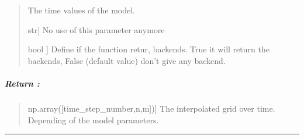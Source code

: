 \documentclass[letterpaper,10pt,english]{sphinxmanual}
\begin{document}
\begin{fulllineitems}
\begin{quote}
\begin{description}
\sphinxAtStartPar
The time values of the model.

\sphinxlineitem{interp\_type}{[}str{]}
\sphinxAtStartPar
No use of this parameter anymore

\sphinxlineitem{backend}{[}bool {]}
\sphinxAtStartPar
Define if the function retur, backends. True it will return the backends, False (default value) don’t give any backend.

\end{description}
\end{quote}


\subparagraph{Return :}
\label{\detokenize{GRID_doc/TIME_GRID_doc:return}}\begin{quote}
\begin{description}
\sphinxlineitem{grid\_interpolated}{[}np.array({[}time\_step\_number,n,m{]}){]}
\sphinxAtStartPar
The interpolated grid over time. Depending of the model parameters.

\end{description}
\end{quote}

\end{fulllineitems}



\bigskip\hrule\bigskip

\end{document}
